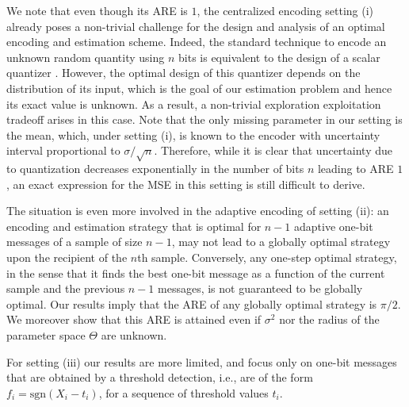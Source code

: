 \documentclass[letterpaper, conference]{IEEEtran}      %
\newcommand{\sgn}{\mathrm{sgn} }
\begin{document}
We note that even though its ARE is $1$, the centralized encoding setting (i) already poses a non-trivial challenge for the design and analysis of an optimal encoding and estimation scheme. Indeed, the standard technique to encode an unknown random quantity using $n$ bits is equivalent to the design of a scalar quantizer \cite{gray1998quantization}. However, the optimal design of this quantizer depends on the distribution of its input, which is the goal of our estimation problem and hence its exact value is unknown. As a result, a non-trivial exploration exploitation tradeoff arises in this case. Note that the only missing parameter in our setting is the mean, which, under setting (i), is known to the encoder with uncertainty interval proportional to $\sigma/\sqrt{n}$. Therefore, while it is clear that uncertainty due to quantization decreases exponentially in the number of bits $n$ leading to ARE $1$, an exact expression for the MSE in this setting is still difficult to derive. \par
The situation is even more involved in the adaptive encoding of setting (ii): an encoding and estimation strategy that is optimal for $n-1$ adaptive one-bit messages of a sample of size $n-1$, may not lead to a globally optimal strategy upon the recipient of the $n$th sample. Conversely, any one-step optimal strategy, in the sense that it finds the best one-bit message as a function of the current sample and the previous $n-1$ messages, is not guaranteed to be globally optimal. Our results imply that the ARE of any globally optimal strategy is $\pi/2$. We moreover show that this ARE is attained  even if $\sigma^2$ nor the radius of the parameter space $\Theta$ are unknown. \par
For setting (iii) our results are more limited, and focus only on one-bit messages that are obtained by a threshold detection, i.e., are of the form $f_i = \sgn(X_i - t_i)$, for a sequence of threshold values $t_i$. 
\end{document}
